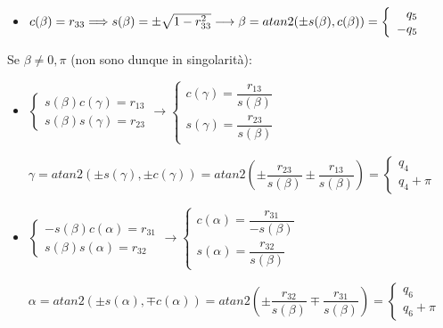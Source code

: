 \documentclass[a4paper,12pt]{article}
\begin{document}
\begin{itemize}
\item  $c(\beta) = r_{33} \Longrightarrow s(\beta) = \pm \sqrt{1-r_{33}^2}
		\hfill \longrightarrow \hfill
		\beta = atan2 (\pm s(\beta), c(\beta)) = \left \{ \begin{array}{rl}
		q_5\\
		-q_5
		\end{array}
		\right.$
\end{itemize}
Se $\beta\neq 0,\pi$ (non sono dunque in singolarità):
\begin{itemize}	

\item $\left \{ \begin{array}{rl}
		s(\beta)c(\gamma)=r_{13} \\
		s(\beta)s(\gamma)=r_{23}
		\end{array}
		\right. %
		\longrightarrow
		\left \{ \begin{array}{rl}
		c(\gamma)=\dfrac{r_{13}}{s(\beta)} \\
		s(\gamma)=\dfrac{r_{23}}{s(\beta)}
		\end{array}
		\right.$
			
$\gamma = atan2 (\pm s(\gamma), \pm c(\gamma)) =   atan2 (\pm \dfrac {r_{23}}{s(\beta)}\pm \dfrac {r_{13}}{s(\beta)})=
		\left \{ \begin{array}{rl}
		q_4\\
		q_4+\pi
		\end{array}
		\right.$
		
		
\item $\left \{ \begin{array}{rl}
		-s(\beta)c(\alpha)=r_{31} \\
		s(\beta)s(\alpha)=r_{32}
		\end{array}
		\right. %
		\longrightarrow
		\left \{ \begin{array}{rl}
		c(\alpha)=\dfrac{r_{31}}{-s(\beta)} \\
		s(\alpha)=\dfrac{r_{32}}{s(\beta)}
		\end{array}
		\right.$
				
		$\alpha = atan2 (\pm s(\alpha),\mp c(\alpha)) = atan2 (\pm \dfrac {r_{32}}{s(\beta)}\mp \dfrac {r_{31}}{s(\beta)})=
		\left \{ \begin{array}{rl}
		q_6\\
		q_6+\pi
		\end{array}
		\right.$

\end{itemize}
\end{document}
